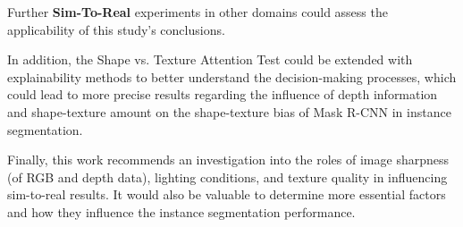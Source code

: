 		Further \textbf{Sim-To-Real} experiments in other domains could assess the applicability of this study's conclusions.
		
		In addition, the Shape vs. Texture Attention Test could be extended with explainability methods to better understand the decision-making processes, which could lead to more precise results regarding the influence of depth information and shape-texture amount on the shape-texture bias of Mask R-CNN in instance segmentation.
		
		Finally, this work recommends an investigation into the roles of image sharpness (of RGB and depth data), lighting conditions, and texture quality in influencing sim-to-real results. It would also be valuable to determine more essential factors and how they influence the instance segmentation performance.
	
		
